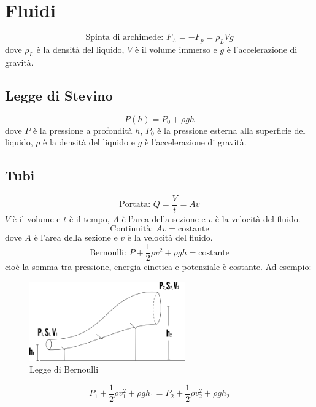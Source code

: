 \documentclass[a4paper]{article}
\theoremstyle{break}
\theoremstyle{break}
\theoremstyle{break}
\theoremstyle{break}
\begin{document}
\section{Fluidi}
\[
  \text{Spinta di archimede: } F_{A} = -F_p = \rho_L V g
\] 
dove \( \rho_L \) è la densità del liquido, \( V \) è il volume immerso e \( g \) è l'accelerazione di gravità.

\subsection{Legge di Stevino}
\[
  P(h) = P_0 + \rho g h
\]
dove \( P \) è la pressione a profondità \( h \), \( P_0 \) è la pressione esterna alla
superficie del liquido, \( \rho \) è la densità del liquido e \( g \) è l'accelerazione di gravità.
\subsection{Tubi}
\[
\text{Portata: } Q = \frac{V}{t} = A v
\] 
\( V \) è il volume e \( t \) è il tempo, \( A \) è l'area della sezione e \( v \) è la velocità del fluido.
\vspace{1em}
\[
  \text{Continuità: } A v = \text{costante}
\] 
dove \( A \) è l'area della sezione e \( v \) è la velocità del fluido.
\[
  \text{Bernoulli: } P + \frac{1}{2} \rho v^2 + \rho g h = \text{costante}
\] 
cioè la somma tra pressione, energia cinetica e potenziale è costante.
Ad esempio:
\begin{figure}[H]
  \begin{center}
    \includegraphics[width=0.6\textwidth]{bernoulli}
  \end{center}
  \caption{Legge di Bernoulli}
\end{figure}

\[
P_1 + \frac{1}{2} \rho v_1^2 + \rho g h_1 = P_2 + \frac{1}{2} \rho v_2^2 + \rho g h_2
\] 
\end{document}
